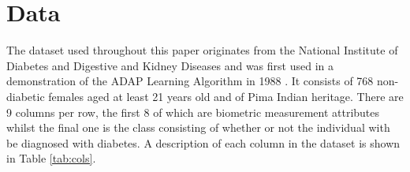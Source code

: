 \section{Data}


The dataset used throughout this paper originates from the National Institute of Diabetes and Digestive and Kidney Diseases and was first used in a demonstration of the ADAP Learning Algorithm in 1988 \cite{pima}. It consists of 768 non-diabetic females aged at least 21 years old and of Pima Indian heritage. There are 9 columns per row, the first 8 of which are biometric measurement attributes whilst the final one is the class consisting of whether or not the individual with be diagnosed with diabetes. A description of each column in the dataset is shown in Table \ref{tab:cols}.

